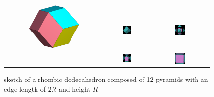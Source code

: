 \begin{figure}[htb]
\begin{tabular}{ccc}
\multirow{2}{*}{\includegraphics[width=0.55\textwidth]{../images/form_factor/oriented_primitive_opbjects/Rhombic_dodecahedron_4color.png}} & & \\
&\includegraphics[width=0.2\textwidth,height=0.2\textwidth]{../images/form_factor/oriented_primitive_opbjects/RhombicDodecahedron2.pdf}
&\includegraphics[width=0.2\textwidth,height=0.2\textwidth]{../images/form_factor/oriented_primitive_opbjects/RhombicDodecahedron4.pdf} \\
&\includegraphics[width=0.2\textwidth,height=0.2\textwidth]{../images/form_factor/oriented_primitive_opbjects/RhombicDodecahedron3.pdf}
&\includegraphics[width=0.2\textwidth,height=0.2\textwidth]{../images/form_factor/oriented_primitive_opbjects/RhombicDodecahedron5.pdf}\\
\end{tabular}
\caption{sketch of a rhombic dodecahedron composed of 12 pyramids with an edge length of $2R$ and height $R$}
\label{fig:opo_rhombic_dodecahedron}
\end{figure}

